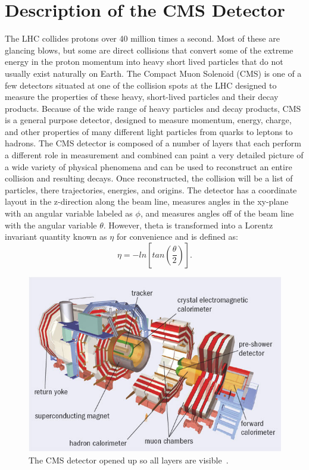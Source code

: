 	\section{Description of the CMS Detector}        
		The LHC collides protons over 40 million times a second. Most of these are glancing blows, but some are direct collisions that convert some of the extreme energy in the proton momentum into heavy short lived particles that do not usually exist naturally on Earth. The Compact Muon Solenoid (CMS) is one of a few detectors situated at one of the collision spots at the LHC designed to measure the properties of these heavy, short-lived particles and their decay products. Because of the wide range of heavy particles and decay products, CMS is a general purpose detector, designed to measure momentum, energy, charge, and other properties of many different light particles from quarks to leptons to hadrons. The CMS detector is composed of a number of layers that each perform a different role in measurement and combined can paint a very detailed picture of a wide variety of physical phenomena and can be used to reconstruct an entire collision and resulting decays. Once reconstructed, the collision will be a list of particles, there trajectories, energies, and origins. The detector has a coordinate layout in the z-direction along the beam line, measures angles in the xy-plane with an angular variable labeled as $\phi$, and measures angles off of the beam line with the angular variable $\theta$. However, theta is transformed into a Lorentz invariant quantity known as $\eta$ for convenience and is defined as:
\begin{equation}
\eta = -ln \left[ tan \left( \frac{\theta}{2} \right) \right].
\end{equation}
		
\begin{figure}[h]
\begin{center}
\includegraphics[width=0.8\linewidth]{Figs/cms_detector_internal_clear.jpg}
\caption{\label{fig:cms_internal}
The CMS detector opened up so all layers are visible~\cite{cmspic}.
}
\end{center}
\end{figure} 

